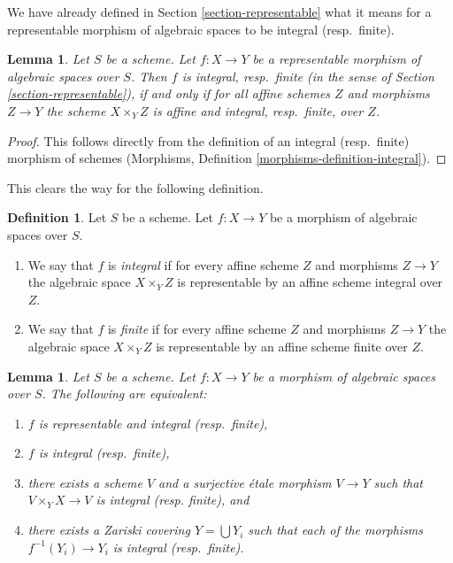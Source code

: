 \documentclass{stacks-project}
\theoremstyle{plain}
\newtheorem{lemma}[subsection]{Lemma}
\theoremstyle{definition}
\newtheorem{definition}[subsection]{Definition}
\theoremstyle{remark}
\numberwithin{equation}{subsection}
\begin{document}
\noindent
We have already defined in Section \ref{section-representable}
what it means for a representable morphism of algebraic spaces
to be integral (resp.\ finite).

\begin{lemma}
\label{lemma-integral-representable}
Let $S$ be a scheme. Let $f : X \to Y$ be a representable
morphism of algebraic spaces over $S$. Then
$f$ is integral, resp.\ finite
(in the sense of Section \ref{section-representable}),
if and only if for all affine schemes $Z$
and morphisms $Z \to Y$ the scheme $X \times_Y Z$ is affine and
integral, resp.\ finite, over $Z$.
\end{lemma}

\begin{proof}
This follows directly from the definition of an integral (resp.\ finite)
morphism of schemes
(Morphisms, Definition \ref{morphisms-definition-integral}).
\end{proof}

\noindent
This clears the way for the following definition.

\begin{definition}
\label{definition-integral}
Let $S$ be a scheme.
Let $f : X \to Y$ be a morphism of algebraic spaces over $S$.
\begin{enumerate}
\item We say that $f$ is {\it integral} if for every affine scheme $Z$
and morphisms $Z \to Y$ the algebraic space $X \times_Y Z$ is
representable by an affine scheme integral over $Z$.
\item We say that $f$ is {\it finite} if for every affine scheme $Z$
and morphisms $Z \to Y$ the algebraic space $X \times_Y Z$ is
representable by an affine scheme finite over $Z$.
\end{enumerate}
\end{definition}

\begin{lemma}
\label{lemma-integral-local}
Let $S$ be a scheme.
Let $f : X \to Y$ be a morphism of algebraic spaces over $S$.
The following are equivalent:
\begin{enumerate}
\item $f$ is representable and integral (resp.\ finite),
\item $f$ is integral (resp.\ finite),
\item there exists a scheme $V$ and a surjective \'etale morphism
$V \to Y$ such that $V \times_Y X \to V$ is integral (resp. finite), and
\item there exists a Zariski covering $Y = \bigcup Y_i$ such that
each of the morphisms $f^{-1}(Y_i) \to Y_i$ is integral (resp.\ finite).
\end{enumerate}
\end{lemma}
\end{document}

